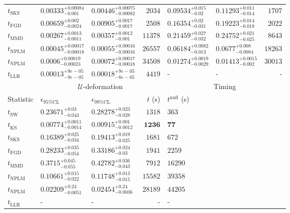 \begin{tabular}{l|llr|llr}
	$t_{\mathrm{SKS}}$ & $0.00333_{-0.001}^{+0.00084}$ & $0.00446_{-0.00082}^{+0.00075}$ & $2034$ & $0.09534_{-0.02}^{+0.015}$ & $0.11293_{-0.014}^{+0.011}$ & $1707$ \\
	$t_{\mathrm{FGD}}$ & $0.00659_{-0.0024}^{+0.002}$ & $0.00905_{-0.0017}^{+0.0017}$ & $2508$ & $0.16354_{-0.031}^{+0.02}$ & $0.19223_{-0.018}^{+0.014}$ & $2022$ \\
	$t_{\mathrm{MMD}}$ & $0.00267_{-0.0011}^{+0.0013}$ & $0.00357_{-0.001}^{+0.0012}$ & $11378$ & $0.21459_{-0.032}^{+0.027}$ & $0.24752_{-0.025}^{+0.021}$ & $8643$ \\
\rowcolor{red!35}	$t_{\mathrm{NPLM}}$ & $0.00045_{-0.00018}^{+0.00017}$ & $0.00055_{-0.00016}^{+0.00016}$ & $26557$ & $0.06184_{-0.013}^{+0.0082}$ & $0.0677_{-0.0084}^{+0.008}$ & $18263$ \\
\rowcolor{blue!35}	$t_{\mathrm{NPLM}}$ & $0.0006_{-0.00023}^{+0.00019}$ & $0.00072_{-0.00018}^{+0.00017}$ & $34508$ & $0.01274_{-0.0029}^{+0.0019}$ & $0.01413_{-0.002}^{+0.0015}$ & $30013$ \\
	$t_{\mathrm{LLR}}$ & $0.00013_{-9e-05}^{+9e-05}$ & $0.00018_{-8e-05}^{+9e-05}$ & $4419$ & - & - & - \\
	\toprule
	\multicolumn{1}{c}{} & \multicolumn{3}{c}{$\mathcal{U}$-deformation} & \multicolumn{3}{c}{Timing} \\
	Statistic & $\epsilon_{95\%\mathrm{CL}}$ & $\epsilon_{99\%\mathrm{CL}}$ & $t$ (s) & $t^{\mathrm{null}}$ (s) \\
	\midrule
	$t_{\mathrm{SW}}$ & $0.23671_{-0.043}^{+0.03}$ & $0.28278_{-0.028}^{+0.023}$ & $1318$ & $363$ \\
	$t_{\overline{\mathrm{KS}}}$ & ${\mathbf{0.00774_{-0.0014}^{+0.0011}}}$ & ${\mathbf{0.00915_{-0.0012}^{+0.001}}}$ & ${\mathbf{1236}}$ & ${\mathbf{77}}$ \\
	$t_{\mathrm{SKS}}$ & $0.16389_{-0.034}^{+0.025}$ & $0.19413_{-0.025}^{+0.019}$ & $1681$ & $672$ \\
	$t_{\mathrm{FGD}}$ & $0.28233_{-0.054}^{+0.035}$ & $0.33186_{-0.03}^{+0.024}$ & $1941$ & $2259$ \\
	$t_{\mathrm{MMD}}$ & $0.3715_{-0.055}^{+0.045}$ & $0.42782_{-0.043}^{+0.036}$ & $7912$ & $16290$ \\
\rowcolor{red!35}	$t_{\mathrm{NPLM}}$ & $0.10661_{-0.022}^{+0.015}$ & $0.11748_{-0.015}^{+0.013}$ & $15582$ & $39358$ \\
\rowcolor{blue!35}	$t_{\mathrm{NPLM}}$ & $0.02209_{-0.0051}^{+0.24}$ & $0.02454_{-0.0036}^{+0.24}$ & $28189$ & $44205$ \\
	$t_{\mathrm{LLR}}$ & - & - & - & - \\
	\bottomrule
\end{tabular}